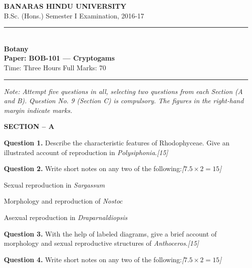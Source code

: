 \documentclass[11pt,a4paper]{article}
\newcommand{\pts}[1]{\hfill   \textit{[#1]}}
\begin{document}
\begin{center}
  {\large\bfseries BANARAS HINDU UNIVERSITY}\\[2pt]
  {\normalsize B.Sc. (Hons.) Semester I Examination, 2016-17}\\[6pt]
  \rule{0.8\linewidth}{0.5pt}\\[6pt]
  {\large\bfseries Botany}\\[4pt]
  {\large\bfseries Paper: BOB-101 --- Cryptogams}\\[4pt]
  {\normalsize Time: Three Hours \hfill Full Marks: 70}
\end{center}

\rule{\linewidth}{0.4pt}

\smallskip



\noindent   \textit{Note: Attempt five questions in all, selecting two questions from each Section (A and B). Question No. 9 (Section C) is compulsory. The figures in the right-hand margin indicate marks.}

\bigskip

\begin{center}
   \textbf{SECTION -- A}
\end{center}

\medskip


\noindent   \textbf{Question 1.} Describe the characteristic features of Rhodophyceae. Give an illustrated account of reproduction in   \textit{Polysiphonia}.\pts{15}

\medskip


\noindent   \textbf{Question 2.} Write short notes on any two of the following:\pts{$7.5  \times 2 = 15$}

\begin{parts}
  \item Sexual reproduction in   \textit{Sargassum}
  \item Morphology and reproduction of   \textit{Nostoc}
  \item Asexual reproduction in   \textit{Draparnaldiopsis}
\end{parts}

\medskip


\noindent   \textbf{Question 3.} With the help of labeled diagrams, give a brief account of morphology and sexual reproductive structures of   \textit{Anthoceros}.\pts{15}

\medskip


\noindent   \textbf{Question 4.} Write short notes on any two of the following:\pts{$7.5  \times 2 = 15$}
\end{document}
